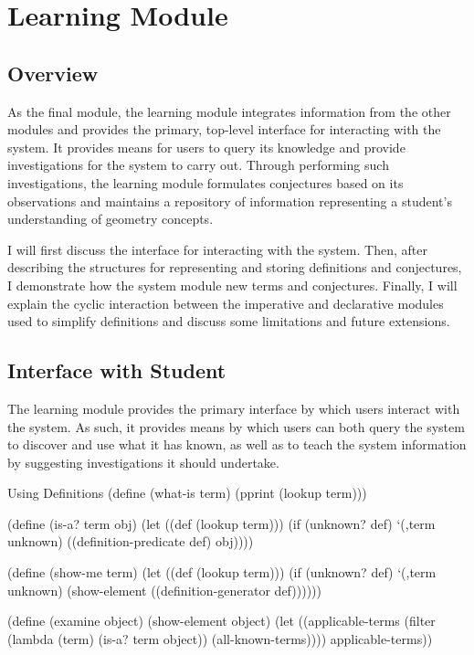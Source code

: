 \chapter{Learning Module}
\label{chap:learning}

\section{Overview}

As the final module, the learning module integrates information from
the other modules and provides the primary, top-level interface for
interacting with the system. It provides means for users to query its
knowledge and provide investigations for the system to carry
out. Through performing such investigations, the learning module
formulates conjectures based on its observations and maintains a
repository of information representing a student's understanding of
geometry concepts.

I will first discuss the interface for interacting with the
system. Then, after describing the structures for representing and
storing definitions and conjectures, I demonstrate how the system
module new terms and conjectures. Finally, I will explain the cyclic
interaction between the imperative and declarative modules used to
simplify definitions and discuss some limitations and future
extensions.


\section{Interface with Student}

The learning module provides the primary interface by which users
interact with the system. As such, it provides means by which users
can both query the system to discover and use what it has known, as
well as to teach the system information by suggesting investigations
it should undertake.

\begin{code-example}{Using Definitions}
(define (what-is term)
  (pprint (lookup term)))

(define (is-a? term obj)
  (let ((def (lookup term)))
    (if (unknown? def)
        `(,term unknown)
        ((definition-predicate def) obj))))

(define (show-me term)
  (let ((def (lookup term)))
    (if (unknown? def)
        `(,term unknown)
        (show-element ((definition-generator def))))))

(define (examine object)
  (show-element object)
  (let ((applicable-terms
         (filter (lambda (term)
                   (is-a? term object))
                 (all-known-terms))))
    applicable-terms))
\end{code-example}

